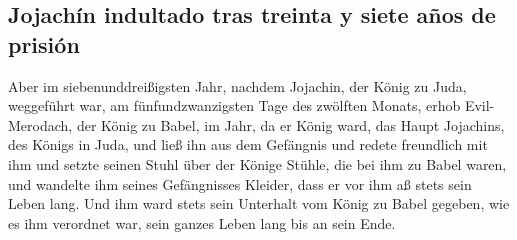 \hypertarget{jojachuxedn-indultado-tras-treinta-y-siete-auxf1os-de-prisiuxf3n}{%
\subsection{Jojachín indultado tras treinta y siete años de
prisión}\label{jojachuxedn-indultado-tras-treinta-y-siete-auxf1os-de-prisiuxf3n}}

 Aber im siebenunddreißigsten Jahr, nachdem Jojachin, der
König zu Juda, weggeführt war, am fünfundzwanzigsten Tage des zwölften
Monats, erhob Evil-Merodach, der König zu Babel, im Jahr, da er König
ward, das Haupt Jojachins, des Königs in Juda, und ließ ihn aus dem
Gefängnis  und redete freundlich mit ihm und setzte
seinen Stuhl über der Könige Stühle, die bei ihm zu Babel waren,
 und wandelte ihm seines Gefängnisses Kleider, dass er
vor ihm aß stets sein Leben lang.  Und ihm ward stets
sein Unterhalt vom König zu Babel gegeben, wie es ihm verordnet war,
sein ganzes Leben lang bis an sein Ende.
